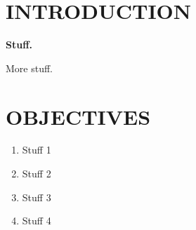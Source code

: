 \documentclass[maize,portrait]{a0poster}
\begin{document}
\begin{multicols}{4} %

  \color{Black} %




  {
    \titlespacing{\section}{0pt}{0pt}{0pt} %
    \section*{INTRODUCTION}
  }

  \textbf{Stuff.}

  More stuff.
  

  \section*{OBJECTIVES}
  \color{CarnegiePriBlue}  

  \begin{enumerate}
  \item Stuff 1
  \item Stuff 2
  \item Stuff 3
  \item Stuff 4
  \end{enumerate}

  \color{Black}



\end{multicols}
\end{document}
